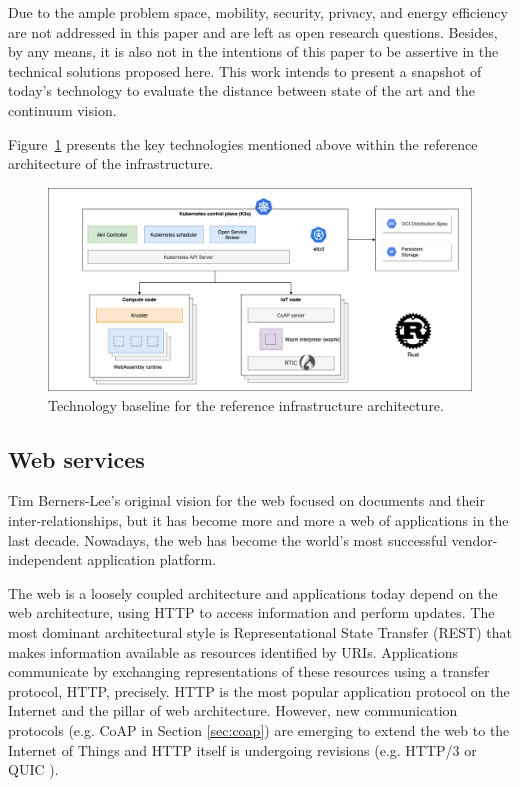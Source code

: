 Due to the ample problem space, mobility, security, privacy, and energy efficiency are not addressed in this paper and are left as open research questions. Besides, by any means, it is also not in the intentions of this paper to be assertive in the technical solutions proposed here. This work intends to present a snapshot of today's technology to evaluate the distance between state of the art and the continuum vision.

Figure~\ref{fig:architecture-technologies} presents the key technologies mentioned above within the reference architecture of the infrastructure.

\begin{figure}[ht]
\centering
\includegraphics[width=\columnwidth]{figures/architecture-technologies}
\caption{Technology baseline for the reference infrastructure architecture.} \label{fig:architecture-technologies}
\end{figure}

\subsection{Web services}
\label{sec:web}

Tim Berners-Lee's original vision for the web focused on documents and their inter-relationships, but it has become more and more a web of applications in the last decade. Nowadays, the web has become the world's most successful vendor-independent application platform.

The web is a loosely coupled architecture and applications today depend on the web architecture, using HTTP to access information and perform updates. The most dominant architectural style is Representational State Transfer (REST) \cite{rest} that makes information available as resources identified by URIs. Applications communicate by exchanging representations of these resources using a transfer protocol, HTTP, precisely. HTTP is the most popular application protocol on the Internet and the pillar of web architecture. However, new communication protocols (e.g. CoAP in Section \ref{sec:coap}) are emerging to extend the web to the Internet of Things and HTTP itself is undergoing revisions (e.g. HTTP/3 or QUIC \cite{langley2017quic}).

